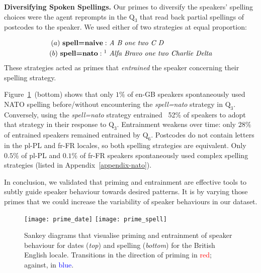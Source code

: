 \documentclass[11pt]{article}
\newcommand{\rparagraph}[1]{\vspace{1.4mm}\noindent\textbf{#1.}}
\begin{document}
{\rparagraph{Diversifying Spoken Spellings}
Our primes to diversify the speakers' spelling choices
were the agent reprompts in the $\text{Q}_3$ 
that read back partial spellings of postcodes to the speaker.
We used either of two strategies at equal proportion:


\vspace{-0.5mm}
{\small
\begin{align*}
(a)\ \textbf{spell=naive}:& \ \textit{A B one two C D} \\
(b)\ \textbf{spell=nato}:\footnotemark& \ \textit{Alfa Bravo one two Charlie Delta}\vspace{-1mm}
\end{align*}}These strategies acted as primes that \textit{entrained}
the speaker concerning their spelling strategy.


Figure~\ref{fig:priming}~(bottom) shows
that only $1\%$ of en-GB speakers
spontaneously used NATO spelling before/without encountering
the \textit{spell=nato} strategy in $\text{Q}_3$.
Conversely,
using the \textit{spell=nato} strategy
entrained ~52\% of speakers to adopt that strategy
in their response to $\text{Q}_3$.
Entrainment weakens over time:
only $28\%$ of entrained speakers
remained entrained by $\text{Q}_6$. Postcodes do not contain letters in the pl-PL and fr-FR locales, so both spelling strategies are equivalent.
Only $0.5\%$ of pl-PL and $0.1\%$ of fr-FR speakers spontaneously used complex spelling strategies (listed in Appendix~\ref{appendix-nato}).

{
In conclusion,
we validated that priming and entrainment 
are effective tools to subtly guide speaker behaviour
towards desired patterns.
It is by varying those primes
that we could increase the variability of speaker behaviours in our dataset.
}

\begin{figure}[t]
\centering
\texttt{[image: prime\_date]}
\texttt{[image: prime\_spell]}
\caption{
    Sankey diagrams that visualise
    priming and entrainment of speaker behaviour
    for dates (\textit{top}) and spelling (\textit{bottom}) for the British English locale.
    Transitions in the direction of priming in \textcolor{red}{red}; against, in \textcolor{blue}{blue}.
}
\label{fig:priming}
\end{figure}

}
\end{document}
